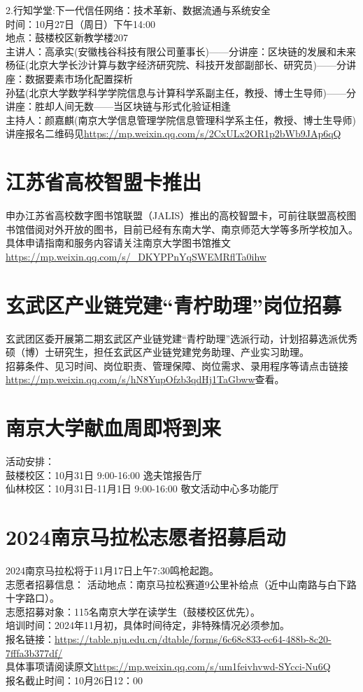 \documentclass[letterpaper, 12pt]{article}
\begin{document}
\begin{multicols}{2}
2.行知学堂:下一代信任网络：技术革新、数据流通与系统安全\\
时间：10月27日（周日）下午14:00\\
地点：鼓楼校区新教学楼207\\
主讲人：高承实(安徽栈谷科技有限公司董事长)——分讲座：区块链的发展和未来\\
杨征(北京大学长沙计算与数字经济研究院、科技开发部副部长、研究员)——分讲座：数据要素市场化配置探析\\
孙猛(北京大学数学科学学院信息与计算科学系副主任，教授、博士生导师)——分讲座：胜却人间无数——当区块链与形式化验证相逢\\
主持人：颜嘉麒(南京大学信息管理学院信息管理科学系主任，教授、博士生导师)\\
讲座报名二维码见\url{https://mp.weixin.qq.com/s/2CxULx2OR1p2bWb9JAp6qQ}

\section{江苏省高校智盟卡推出}
申办江苏省高校数字图书馆联盟（JALIS）推出的高校智盟卡，可前往联盟高校图书馆借阅对外开放的图书，目前已经有东南大学、南京师范大学等多所学校加入。\\
具体申请指南和服务内容请关注南京大学图书馆推文\url{https://mp.weixin.qq.com/s/_DKYPPnYqSWEMRflTa0ihw}\\
\section{玄武区产业链党建“青柠助理”岗位招募}
玄武团区委开展第二期玄武区产业链党建“青柠助理”选派行动，计划招募选派优秀硕（博）士研究生，担任玄武区产业链党建党务助理、产业实习助理。\\
招募条件、见习时间、岗位职责、管理保障、岗位需求、录用程序等请点击链接\url{https://mp.weixin.qq.com/s/hN8YupOfzb3qdHj1TaGbww}查看。\\
\section{南京大学献血周即将到来}
活动安排：\\
鼓楼校区：10月31日 9:00-16:00 逸夫馆报告厅\\
仙林校区：10月31日-11月1日 9:00-16:00 敬文活动中心多功能厅\\
\section{2024南京马拉松志愿者招募启动}
2024南京马拉松将于11月17日上午7:30鸣枪起跑。\\
志愿者招募信息：
活动地点：南京马拉松赛道9公里补给点（近中山南路与白下路十字路口）。\\
志愿招募对象：115名南京大学在读学生（鼓楼校区优先）。\\
培训时间：2024年11月初，具体时间待定，非特殊情况必须参加。\\
报名链接：\url{https://table.nju.edu.cn/dtable/forms/6c68c833-ec64-488b-8c20-7fffa3b377df/}\\
具体事项请阅读原文\url{https://mp.weixin.qq.com/s/um1feivhvwd-SYcci-Nu6Q}\\
报名截止时间：10月26日12：00\\

\end{multicols}
\end{document}
